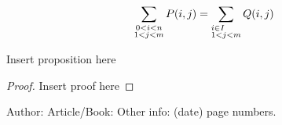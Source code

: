 \documentclass{llncs}
\begin{document}
\begin{displaymath}
\sum_{\substack{0<i<n \\ 1<j<m}}
P(i,j) =
\sum_{\begin{subarray}{l}
i\in I\\
1<j<m
\end{subarray}} Q(i,j)
\end{displaymath}

\begin{proposition}
Insert proposition here
\end{proposition}

\begin{proof}
Insert proof here
\end{proof}



%
%

\begin{thebibliography}{1}
Author:
Article/Book:
Other info: (date) page numbers.
\end{thebibliography}
\fi
\end{document}
